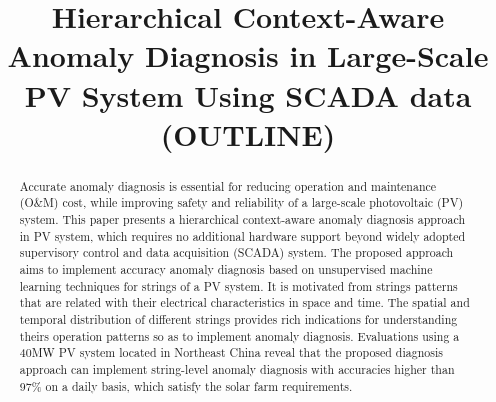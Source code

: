 \documentclass[journal]{IEEEtran}
\begin{document}
\title{Hierarchical Context-Aware Anomaly Diagnosis in Large-Scale PV System Using SCADA data (OUTLINE)}
\maketitle

\begin{abstract}
Accurate anomaly diagnosis is essential for reducing operation and maintenance (O\&M) cost, while improving safety and reliability of a large-scale photovoltaic (PV) system. This paper presents a hierarchical context-aware anomaly diagnosis approach in PV system, which requires no additional hardware support beyond widely adopted supervisory control and data acquisition (SCADA) system. The proposed approach aims to implement accuracy anomaly diagnosis based on unsupervised machine learning techniques for strings of a PV system. It is motivated from strings  patterns that are related with their electrical characteristics in space and time.  The spatial and temporal distribution of different strings provides rich indications for understanding theirs operation patterns so as to implement anomaly diagnosis. Evaluations using a 40MW PV system located in Northeast China reveal that the proposed diagnosis approach can implement string-level anomaly diagnosis with accuracies higher than \textcolor[rgb]{1,0,0}{97\%} on a daily basis, which satisfy the solar farm requirements.
\end{abstract}
\end{document}
